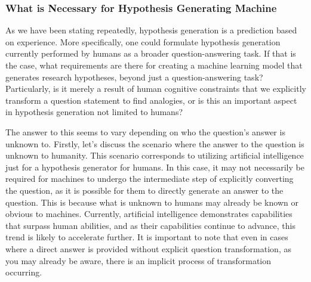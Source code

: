 \documentclass{book}
\begin{document}
\subsubsection{What is Necessary for Hypothesis Generating Machine}
As we have been stating repeatedly, hypothesis generation is a prediction based on experience. More specifically, one could formulate hypothesis generation currently performed by humans as a broader question-answering task. If that is the case, what requirements are there for creating a machine learning model that generates research hypotheses, beyond just a question-answering task? Particularly, is it merely a result of human cognitive constraints that we explicitly transform a question statement to find analogies, or is this an important aspect in hypothesis generation not limited to humans?

The answer to this seems to vary depending on who the question's answer is unknown to. Firstly, let's discuss the scenario where the answer to the question is unknown to humanity. This scenario corresponds to utilizing artificial intelligence just for a hypothesis generator for humans. In this case, it may not necessarily be required for machines to undergo the intermediate step of explicitly converting the question, as it is possible for them to directly generate an answer to the question. This is because what is unknown to humans may already be known or obvious to machines. Currently, artificial intelligence demonstrates capabilities that surpass human abilities, and as their capabilities continue to advance, this trend is likely to accelerate further. It is important to note that even in cases where a direct answer is provided without explicit question transformation, as you may already be aware, there is an implicit process of transformation occurring.
\end{document}
